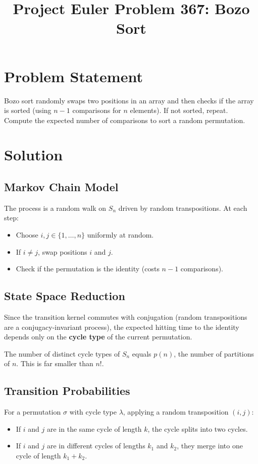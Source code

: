 \documentclass[12pt]{article}
\title{Project Euler Problem 367: Bozo Sort}
\author{}
\date{}
\begin{document}
\maketitle

\section{Problem Statement}
Bozo sort randomly swaps two positions in an array and then checks if the array is sorted (using $n-1$ comparisons for $n$ elements). If not sorted, repeat. Compute the expected number of comparisons to sort a random permutation.

\section{Solution}

\subsection{Markov Chain Model}
The process is a random walk on $S_n$ driven by random transpositions. At each step:
\begin{itemize}
\item Choose $i, j \in \{1, \ldots, n\}$ uniformly at random.
\item If $i \neq j$, swap positions $i$ and $j$.
\item Check if the permutation is the identity (costs $n-1$ comparisons).
\end{itemize}

\subsection{State Space Reduction}
Since the transition kernel commutes with conjugation (random transpositions are a conjugacy-invariant process), the expected hitting time to the identity depends only on the \textbf{cycle type} of the current permutation.

The number of distinct cycle types of $S_n$ equals $p(n)$, the number of partitions of $n$. This is far smaller than $n!$.

\subsection{Transition Probabilities}
For a permutation $\sigma$ with cycle type $\lambda$, applying a random transposition $(i,j)$:
\begin{itemize}
\item If $i$ and $j$ are in the same cycle of length $k$, the cycle splits into two cycles.
\item If $i$ and $j$ are in different cycles of lengths $k_1$ and $k_2$, they merge into one cycle of length $k_1 + k_2$.
\end{itemize}
\end{document}
